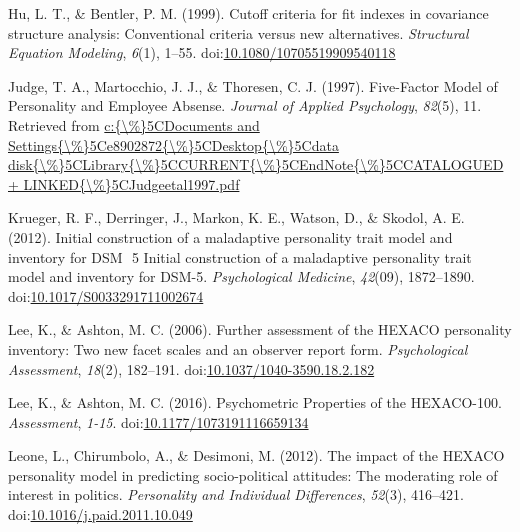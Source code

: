 \documentclass[,man,floatsintext]{apa6}
\begin{document}
\hypertarget{ref-Hu1999}{}
Hu, L. T., \& Bentler, P. M. (1999). Cutoff criteria for fit indexes in
covariance structure analysis: Conventional criteria versus new
alternatives. \emph{Structural Equation Modeling}, \emph{6}(1), 1--55.
doi:\href{https://doi.org/10.1080/10705519909540118}{10.1080/10705519909540118}

\hypertarget{ref-Judge1997}{}
Judge, T. A., Martocchio, J. J., \& Thoresen, C. J. (1997). Five-Factor
Model of Personality and Employee Absense. \emph{Journal of Applied
Psychology}, \emph{82}(5), 11. Retrieved from
\href{c:\%7B/\%\%7D5CDocuments\%20and\%20Settings\%7B/\%\%7D5Ce8902872\%7B/\%\%7D5CDesktop\%7B/\%\%7D5Cdata\%20disk\%7B/\%\%7D5CLibrary\%7B/\%\%7D5CCURRENT\%7B/\%\%7D5CEndNote\%7B/\%\%7D5CCATALOGUED\%20+\%20LINKED\%7B/\%\%7D5CJudgeetal1997.pdf}{c:\{\textbackslash{}\%\}5CDocuments and Settings\{\textbackslash{}\%\}5Ce8902872\{\textbackslash{}\%\}5CDesktop\{\textbackslash{}\%\}5Cdata disk\{\textbackslash{}\%\}5CLibrary\{\textbackslash{}\%\}5CCURRENT\{\textbackslash{}\%\}5CEndNote\{\textbackslash{}\%\}5CCATALOGUED + LINKED\{\textbackslash{}\%\}5CJudgeetal1997.pdf}

\hypertarget{ref-Krueger2012a}{}
Krueger, R. F., Derringer, J., Markon, K. E., Watson, D., \& Skodol, A.
E. (2012). Initial construction of a maladaptive personality trait model
and inventory for DSM ­ 5 Initial construction of a maladaptive
personality trait model and inventory for DSM-5. \emph{Psychological
Medicine}, \emph{42}(09), 1872--1890.
doi:\href{https://doi.org/10.1017/S0033291711002674}{10.1017/S0033291711002674}

\hypertarget{ref-Lee2006}{}
Lee, K., \& Ashton, M. C. (2006). Further assessment of the HEXACO
personality inventory: Two new facet scales and an observer report form.
\emph{Psychological Assessment}, \emph{18}(2), 182--191.
doi:\href{https://doi.org/10.1037/1040-3590.18.2.182}{10.1037/1040-3590.18.2.182}

\hypertarget{ref-Lee2016}{}
Lee, K., \& Ashton, M. C. (2016). Psychometric Properties of the
HEXACO-100. \emph{Assessment}, \emph{1-15}.
doi:\href{https://doi.org/10.1177/1073191116659134}{10.1177/1073191116659134}

\hypertarget{ref-Leone2012}{}
Leone, L., Chirumbolo, A., \& Desimoni, M. (2012). The impact of the
HEXACO personality model in predicting socio-political attitudes: The
moderating role of interest in politics. \emph{Personality and
Individual Differences}, \emph{52}(3), 416--421.
doi:\href{https://doi.org/10.1016/j.paid.2011.10.049}{10.1016/j.paid.2011.10.049}
\end{document}
